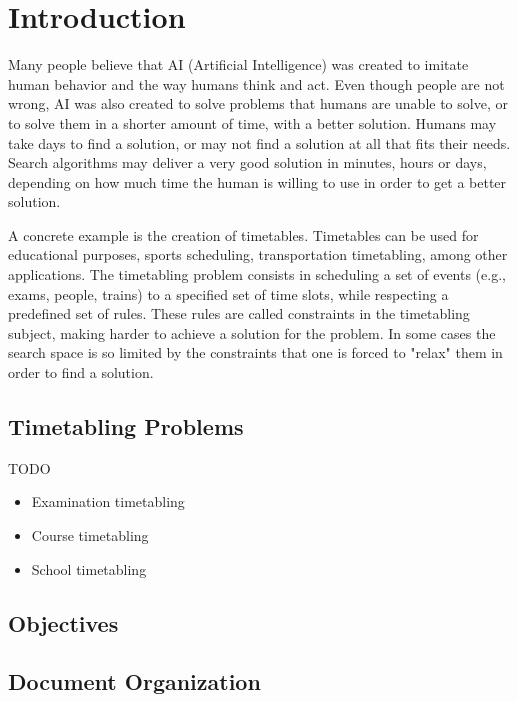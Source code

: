 \setcounter{secnumdepth}{3}
\chapter{Introduction}
\label{introduction}
\thispagestyle{plain}

Many people believe that AI (Artificial Intelligence) was created to imitate human behavior and the way humans think and act. Even though people are not wrong, AI was also created to solve problems that humans are unable to solve, or to solve them in a shorter amount of time, with a better solution. Humans may take days to find a solution, or may not find a solution at all that fits their needs. Search algorithms may deliver a very good solution in minutes, hours or days, depending on how much time the human is willing to use in order to get a better solution.

A concrete example is the creation of timetables. Timetables can be used for educational purposes, sports scheduling, transportation timetabling, among other applications. The timetabling problem consists in scheduling a set of events (e.g., exams, people, trains) to a specified set of time slots, while respecting a predefined set of rules. These rules are called constraints in the timetabling subject, making harder to achieve a solution for the problem. In some cases the search space is so limited by the constraints that one is forced to "relax" them in order to find a solution. 


\section{Timetabling Problems}

TODO

\begin{itemize}
	\item Examination timetabling
	\item Course timetabling
	\item School timetabling
\end{itemize}



\section{Objectives}




\section{Document Organization}






